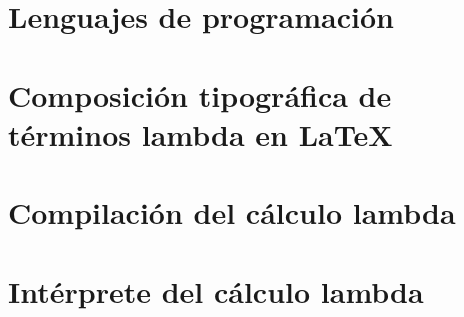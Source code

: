 \documentclass[12pt]{tesislcc}
\begin{document}
\chapter{Lenguajes de programación}


\conclusiones%



\appendix

\chapter{Composición tipográfica de términos lambda en \LaTeX}


\chapter{Compilación del cálculo lambda}


\chapter{Intérprete del cálculo lambda}


\listoffigures
\listoftables
\listofalgorithms%
\listoflistings%

\nocite{*}

\end{document}
